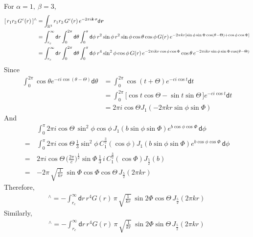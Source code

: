 \documentclass[aps,pre,preprint]{revtex4}
\renewcommand{\v}[1]{\textbf{\textit{#1}}}
\renewcommand{\d}[1]{\textsf{#1}}
\begin{document}
For $\alpha = 1,\ \beta = 3$,
\begin{align}\nonumber
  [\,r_1 r_3\,G^c(r)\,]^{\wedge} 
  &= \int_{\mathbb R^3} r_1 r_3\,G^c(r)\, e^{-2\pi i\v k\cdot\v r}\d d\v r \\\nonumber
  &= \int_{r_c}^\infty \d dr \int_{0}^{2\pi} \d d\theta \int_0^\pi\d d\phi\:
  r^2\sin\phi \,r^2 \sin\phi\cos\theta\cos\phi  \,G(r)\,
  e^{-2\pi k r[\sin\phi\sin\Phi\cos(\theta - \Theta) + \cos\phi\cos\Phi]} \\
  &= \int_{r_c}^\infty \d dr \int_{0}^{2\pi} \d d\theta \int_0^\pi\d d\phi\:
  r^4\sin^2\phi\cos\phi\,G(r)\,e^{-2\pi i kr\cos\phi\cos\Phi}
  \cos\theta\,e^{-2\pi i kr\sin\phi\sin\Phi\cos(\theta- \Theta)}
\end{align}
Since
\begin{align}\nonumber
  \int_0^{2\pi}\cos\theta e^{-c i\cos(\theta - \Theta)} \d d\theta
  &=
  \int_0^{2\pi}\cos(t+\Theta) e^{-c i\cos t} \d d t\\\nonumber
  & =
  \int_0^{2\pi}
  \big[
   \cos t\cos \Theta - \sin t\sin \Theta
  \,\big]
  e^{-c i\cos t} \d dt \\\nonumber
  &=
  2\pi i  \cos \Theta J_1(-2\pi kr\sin\phi\sin\Phi)
\end{align}
And
\begin{align}\nonumber
  &
  \int_0^\pi
  2\pi i \cos \Theta\,
  \sin^2\phi\cos\phi\,
  J_1(b\sin\phi\sin\Phi) e^{b\cos\phi\cos\Phi} \,\d d\phi \\\nonumber
  = \,&
  \int_0^\pi
  2\pi i \cos \Theta\,
  \frac13\sin^2\phi\, C_1^{\frac32}(\cos\phi)
  J_1(b\sin\phi\sin\Phi) e^{b\cos\phi\cos\Phi} \,\d d\phi \\\nonumber
  = \,&
  2\pi i \cos \Theta\,
  \big(
  \frac{2\pi}{c}
  \big)^{\frac12}
  \sin\Phi\, \frac 13\,i\, C_1^{\frac32}(\cos\Phi)
  J_{\frac52}(b) \\\nonumber
  = \,&
  -2 \pi\,
  \sqrt{\frac1{kr}}\:
  \sin\Phi\cos\Phi\cos\Theta \,J_{\frac52}(2\pi kr) 
\end{align}
Therefore,
\begin{align}
  [\,r_1 r_3\,G^c(r)\,]^{\wedge} 
  =
  -\int_{r_c}^\infty
  \d dr\,
  r^4G(r)\,\pi\,
  \sqrt{\frac1{kr}}\:
  \sin2\Phi\cos\Theta\,J_{\frac52}(2\pi kr)\,
\end{align}
Similarly,
\begin{align}
  [\,r_2 r_3\,G^c(r)\,]^{\wedge} 
  =
  -\int_{r_c}^\infty
  \d dr\,
  r^4G(r)\,\pi\,
  \sqrt{\frac1{kr}}\:
  \sin2\Phi\sin\Theta\,J_{\frac52}(2\pi kr)\,
\end{align}
\end{document}

